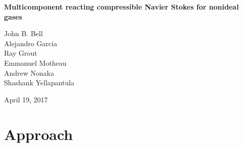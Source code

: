 \documentclass[11pt]{article}
\begin{document}
\begin{center}
{\bf
Multicomponent reacting compressible Navier Stokes for nonideal gases
}

\vspace{\baselineskip}
John B. Bell \\
Alejandro Garcia \\
Ray Grout \\
Emmanuel Motheau \\
Andrew Nonaka \\
Shashank Yellapantula

\vspace{\baselineskip}
April 19, 2017
\end{center}

\section{Approach}
\end{document}
